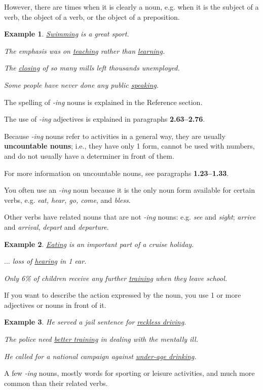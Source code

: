 \documentclass[oneside]{book}
\numberwithin{equation}{section}
\newtheorem{example}{Example}[section]
\begin{document}
However, there are times when it is clearly a noun, e.g. when it is the subject of a verb, the object of a verb, or the object of a preposition.
\begin{example}
    \underline{Swimming} is a great sport.
    
    The emphasis was on \underline{teaching} rather than \underline{learning}.
    
    The \underline{closing} of so many mills left thousands unemployed.
    
    Some people have never done any public \underline{speaking}.
\end{example}
The spelling of \textit{-ing} nouns is explained in the Reference section.

The use of \textit{-ing} adjectives is explained in paragraphs \textbf{2.63--2.76}.

%
\noindent{} Because \textit{-ing} nouns refer to activities in a general way, they are usually \textbf{uncountable nouns}; i.e., they have only 1 form, cannot be used with numbers, and do not usually have a determiner in front of them.

%
For more information on uncountable nouns, see paragraphs \textbf{1.23--1.33}.

%
\noindent{} You often use an \textit{-ing} noun because it is the only noun form available for certain verbs, e.g. \textit{eat, hear, go, come}, and \textit{bless}.

Other verbs have related nouns that are not \textit{-ing} nouns: e.g. \textit{see} and \textit{sight}; \textit{arrive} and \textit{arrival}, \textit{depart} and \textit{departure}.
\begin{example}
    \underline{Eating} is an important part of a cruise holiday.
    
    $\ldots$ loss of \underline{hearing} in 1 ear.
    
    Only 6\% of children receive any further \underline{training} when they leave school.
\end{example}
%
\noindent{} If you want to describe the action expressed by the noun, you use 1 or more adjectives or nouns in front of it.
\begin{example}
    He served a jail sentence for \underline{reckless driving}.
    
    The police need \underline{better training} in dealing with the mentally ill.
    
    He called for a national campaign against \underline{under-age drinking}.
\end{example}
%
\noindent{} A few \textit{-ing} nouns, mostly words for sporting or leisure activities, and much more common than their related verbs.
\end{document}
